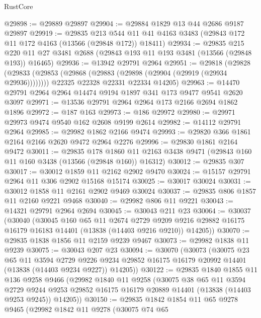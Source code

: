 \begin{lexlean}{RustCore}
\begin{coremodule}
@29898 := @29889 @29897
@29904 := @29884 @1829 @13 @44 @2686 @9187 @29897
@29919 := @29835
    @213
    @544
    @11
    @41
    @4163
    @3483
    (@29843 @172 @11 @172 @4163 (@13566 (@29848 @172)) @18411)
@29934 := @29835
    @215
    @220
    @11
    @27
    @3481
    @2688
    (@29843 @193 @11 @193 @3481 (@13566 (@29848 @193)) @16465)
@29936 := @13942 @29791 @2964
@29951 := @29818
    (@29828
      (@29833 (@29853 (@29868 (@29883 (@29898 (@29904 (@29919 (@29934 @29936))))))))
      @22325
      @22328
      @22331
      @22334
      @14205)
@29963 := @14470 @29791 @2964 @2964 @14474 @9194 @1897 @341 @173 @9477 @9541 @2620 @3097
@29971 := @13536 @29791 @2964 @2964 @173 @2166 @2694 @1862 @1896
@29972 := @187 @163
@29973 := @186 @29972
@29980 := @29971 @29973 @9474 @9540 @162 @2608 @9199 @2614
@29982 := @14112 @29791 @2964
@29985 := @29982 @1862 @2166 @9474
@29993 := @29820 @366 @1861 @2164 @2166 @2620 @9472 @2964 @2276
@29996 := @29830 @1861 @2164 @9472
@30011 := @29835
    @178
    @1860
    @11
    @2163
    @3438
    @9471
    (@29843 @160 @11 @160 @3438 (@13566 (@29848 @160)) @16312)
@30012 := @29835 @307
@30017 := @30012 @1859 @11 @2162 @2902 @9470
@30024 := @15157 @29791 @2964 @11 @306 @2902 @15168 @15174
@30025 := @30017 @30024
@30031 := @30012 @1858 @11 @2161 @2902 @9469 @30024
@30037 := @29835 @806 @1857 @11 @2160 @9221 @9468
@30040 := @29982 @806 @11 @9221
@30043 := @14321 @29791 @2964 @2694
@30045 := @30043 @211 @23
@30064 := @30037
    (@30040
      (@30045
        @160
        @65
        @11
        @2674
        @2729
        @9209
        @9216
        @29882
        @16175
        @16179
        @16183
        @14401
        (@13838 (@14403 @9216 @9210))
        @14205))
@30070 := @29835 @1838 @1856 @11 @2159 @9239 @9467
@30073 := @29982 @1838 @11 @9239
@30075 := @30043 @207 @23
@30094 := @30070
    (@30073
      (@30075
        @23
        @65
        @11
        @3594
        @2729
        @9226
        @9234
        @29852
        @16175
        @16179
        @20992
        @14401
        (@13838 (@14403 @9234 @9227))
        @14205))
@30122 := @29835
    @1840
    @1855
    @11
    @136
    @9258
    @9466
    (@29982
      @1840
      @11
      @9258
      (@30075
        @38
        @65
        @11
        @3594
        @2729
        @9244
        @9253
        @29852
        @16175
        @16179
        @20889
        @14401
        (@13838 (@14403 @9253 @9245))
        @14205))
@30150 := @29835
    @1842
    @1854
    @11
    @65
    @9278
    @9465
    (@29982
      @1842
      @11
      @9278
      (@30075
        @74
        @65

\end{coremodule}
\end{lexlean}
